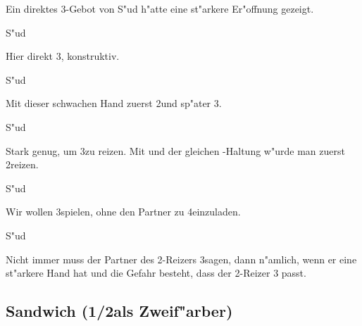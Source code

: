 Ein direktes 3\tre-Gebot von S"ud h"atte eine st"arkere Er"offnung gezeigt.

S"ud \\

Hier direkt 3\kar, konstruktiv.

S"ud \\

Mit dieser schwachen Hand zuerst 2\SA und sp"ater 3\kar.

S"ud \\

Stark genug, um 3\kar zu reizen. Mit \co{}\hspace{\cardskip}
und der gleichen \ka-Haltung w"urde man zuerst 2\SA reizen.

S"ud \\

Wir wollen 3\coe spielen, ohne den Partner zu 4\coe einzuladen.

S"ud \\

Nicht immer muss der Partner des 2\SA-Reizers 3\tre sagen, dann n"amlich, wenn
er eine st"arkere Hand hat und die Gefahr besteht, dass der 2\SA-Reizer 3\tre
passt.

\subsection{Sandwich \nt (1\SA/2\SA als Zweif"arber)\label{sandwichnt}}

